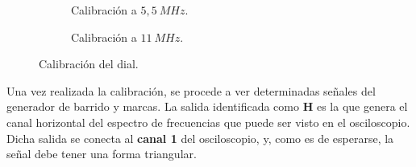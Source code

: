     \begin{figure}[H]
      \centering
      \begin{subfigure}[ht]{0.48\textwidth}
        \caption{Calibración a $5,5~MHz$.}
        \label{fig:Calib5_5MHz}
      \end{subfigure}
      \hfill 
      \begin{subfigure}[ht]{0.48\textwidth}
        \caption{Calibración a $11~MHz$.}
        \label{fig:Calib11MHz}
      \end{subfigure}

      \caption{Calibración del dial.}
      \label{fig:CalibDial}
    \end{figure}

    Una vez realizada la calibración, se procede a ver determinadas señales del generador de barrido y marcas. La salida
    identificada como \textbf{H} es la que genera el canal horizontal del espectro de frecuencias que puede ser visto
    en el osciloscopio. Dicha salida se conecta al \textbf{canal 1} del osciloscopio, y, como es de esperarse, la señal debe 
    tener una forma triangular.

